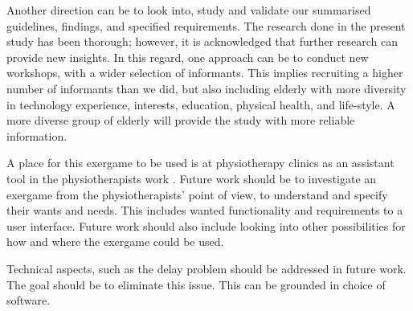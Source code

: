Another direction can be to look into, study and validate our summarised guidelines, findings, and specified requirements. The research done in the present study has been thorough; however, it is acknowledged that further research can provide new insights. In this regard, one approach can be to conduct new workshops, with a wider selection of informants. This implies recruiting a higher number of informants than we did, but also including elderly with more diversity in technology experience, interests, education, physical health, and life-style. A more diverse group of elderly will provide the study with more reliable information.   

A place for this exergame to be used is at physiotherapy clinics as an assistant tool in the physiotherapists work \cite{project}. Future work should be to investigate an exergame from the physiotherapists' point of view, to understand and specify their wants and needs. This includes wanted functionality and requirements to a user interface. Future work should also include looking into other possibilities for how and where the exergame could be used.   

Technical aspects, such as the delay problem should be addressed in future work. The goal should be to eliminate this issue. This can be grounded in choice of software. 
